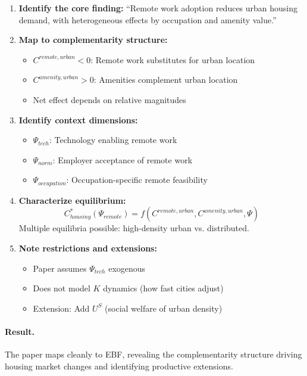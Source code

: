 \begin{enumerate}
\item \textbf{Identify the core finding:}
    ``Remote work adoption reduces urban housing demand, with heterogeneous
    effects by occupation and amenity value.''

\item \textbf{Map to complementarity structure:}
    \begin{itemize}
    \item $C^{remote, urban} < 0$: Remote work substitutes for urban location
    \item $C^{amenity, urban} > 0$: Amenities complement urban location
    \item Net effect depends on relative magnitudes
    \end{itemize}

\item \textbf{Identify context dimensions:}
    \begin{itemize}
    \item $\Psi_{tech}$: Technology enabling remote work
    \item $\Psi_{norm}$: Employer acceptance of remote work
    \item $\Psi_{occupation}$: Occupation-specific remote feasibility
    \end{itemize}

\item \textbf{Characterize equilibrium:}
    \begin{equation}
    C^*_{housing}(\Psi_{remote}) = f(C^{remote,urban}, C^{amenity,urban}, \Psi)
    \end{equation}
    Multiple equilibria possible: high-density urban vs. distributed.

\item \textbf{Note restrictions and extensions:}
    \begin{itemize}
    \item Paper assumes $\Psi_{tech}$ exogenous
    \item Does not model $K$ dynamics (how fast cities adjust)
    \item Extension: Add $U^S$ (social welfare of urban density)
    \end{itemize}
\end{enumerate}

\paragraph{Result.}
The paper maps cleanly to EBF, revealing the complementarity structure
driving housing market changes and identifying productive extensions.

